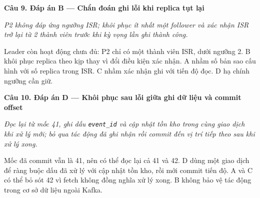 \noindent\textbf{Câu 9. Đáp án B --- Chẩn đoán ghi lỗi khi replica tụt lại}\par
\noindent\emph{P2 không đáp ứng ngưỡng ISR; khôi phục ít nhất một follower và xác nhận ISR trở lại từ 2 thành viên trước khi kỳ vọng lần ghi thành công.}\par
Leader còn hoạt động chưa đủ: P2 chỉ có một thành viên ISR, dưới ngưỡng 2. B khôi phục replica theo kịp thay vì đổi điều kiện xác nhận. A nhầm số bản sao cấu hình với số replica trong ISR. C nhầm xác nhận ghi với tiến độ đọc. D hạ chính ngưỡng cần giữ.\par\addvspace{0.8em}

\noindent\textbf{Câu 10. Đáp án D --- Khôi phục sau lỗi giữa ghi dữ liệu và commit offset}\par
\noindent\emph{Đọc lại từ mốc 41, ghi dấu \texttt{event\_id} và cập nhật tồn kho trong cùng giao dịch khi xử lý mới; bỏ qua tác động đã ghi nhận rồi commit đến vị trí tiếp theo sau khi xử lý xong.}\par
Mốc đã commit vẫn là 41, nên có thể đọc lại cả 41 và 42. D dùng một giao dịch để ràng buộc dấu đã xử lý với cập nhật tồn kho, rồi mới commit tiến độ. A và C có thể bỏ sót 42 vì fetch không đồng nghĩa xử lý xong. B không bảo vệ tác động trong cơ sở dữ liệu ngoài Kafka.\par\addvspace{0.8em}

